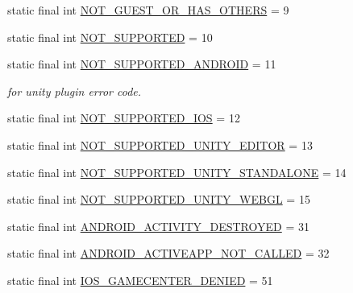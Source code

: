 \begin{DoxyCompactItemize}
\item 
static final int \hyperlink{classcom_1_1toast_1_1android_1_1gamebase_1_1base_1_1_gamebase_error_aa4cfcd7abc10b285fbd2aa92be371d05}{N\+O\+T\+\_\+\+G\+U\+E\+S\+T\+\_\+\+O\+R\+\_\+\+H\+A\+S\+\_\+\+O\+T\+H\+E\+RS} = 9
\item 
static final int \hyperlink{classcom_1_1toast_1_1android_1_1gamebase_1_1base_1_1_gamebase_error_acd9b3f5149cd30338cc6795919ad1c6f}{N\+O\+T\+\_\+\+S\+U\+P\+P\+O\+R\+T\+ED} = 10
\item 
static final int \hyperlink{classcom_1_1toast_1_1android_1_1gamebase_1_1base_1_1_gamebase_error_adb77253190b30524cadc6f8c0bb55391}{N\+O\+T\+\_\+\+S\+U\+P\+P\+O\+R\+T\+E\+D\+\_\+\+A\+N\+D\+R\+O\+ID} = 11
\begin{DoxyCompactList}\small\item\em for unity plugin error code. \end{DoxyCompactList}\item 
static final int \hyperlink{classcom_1_1toast_1_1android_1_1gamebase_1_1base_1_1_gamebase_error_a788dd7e723a82d89ade5d47c71c3a19d}{N\+O\+T\+\_\+\+S\+U\+P\+P\+O\+R\+T\+E\+D\+\_\+\+I\+OS} = 12
\item 
static final int \hyperlink{classcom_1_1toast_1_1android_1_1gamebase_1_1base_1_1_gamebase_error_a4210f1c3db853e07619403a3e59d80b8}{N\+O\+T\+\_\+\+S\+U\+P\+P\+O\+R\+T\+E\+D\+\_\+\+U\+N\+I\+T\+Y\+\_\+\+E\+D\+I\+T\+OR} = 13
\item 
static final int \hyperlink{classcom_1_1toast_1_1android_1_1gamebase_1_1base_1_1_gamebase_error_a2bfe4d07386e86ae23540ca906d805fd}{N\+O\+T\+\_\+\+S\+U\+P\+P\+O\+R\+T\+E\+D\+\_\+\+U\+N\+I\+T\+Y\+\_\+\+S\+T\+A\+N\+D\+A\+L\+O\+NE} = 14
\item 
static final int \hyperlink{classcom_1_1toast_1_1android_1_1gamebase_1_1base_1_1_gamebase_error_a65c66b579258bb75c777a0a9dd4f4248}{N\+O\+T\+\_\+\+S\+U\+P\+P\+O\+R\+T\+E\+D\+\_\+\+U\+N\+I\+T\+Y\+\_\+\+W\+E\+B\+GL} = 15
\item 
static final int \hyperlink{classcom_1_1toast_1_1android_1_1gamebase_1_1base_1_1_gamebase_error_a3bb1bf5ccc1b6644e6e9e4a3dbda16e7}{A\+N\+D\+R\+O\+I\+D\+\_\+\+A\+C\+T\+I\+V\+I\+T\+Y\+\_\+\+D\+E\+S\+T\+R\+O\+Y\+ED} = 31
\item 
static final int \hyperlink{classcom_1_1toast_1_1android_1_1gamebase_1_1base_1_1_gamebase_error_ac04feb670905098cfe714fb8cc742453}{A\+N\+D\+R\+O\+I\+D\+\_\+\+A\+C\+T\+I\+V\+E\+A\+P\+P\+\_\+\+N\+O\+T\+\_\+\+C\+A\+L\+L\+ED} = 32
\item 
static final int \hyperlink{classcom_1_1toast_1_1android_1_1gamebase_1_1base_1_1_gamebase_error_a304437763f2e717daaa1d6df700e4c87}{I\+O\+S\+\_\+\+G\+A\+M\+E\+C\+E\+N\+T\+E\+R\+\_\+\+D\+E\+N\+I\+ED} = 51

\end{DoxyCompactItemize}
